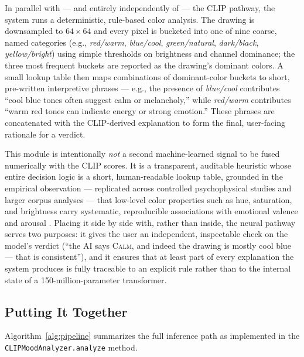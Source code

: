 \documentclass[10pt,twocolumn,letterpaper]{article}
\begin{document}
In parallel with --- and entirely independently of --- the CLIP pathway, the system runs a deterministic, rule-based color analysis. The drawing is downsampled to $64\times64$ and every pixel is bucketed into one of nine coarse, named categories (e.g., \emph{red/warm}, \emph{blue/cool}, \emph{green/natural}, \emph{dark/black}, \emph{yellow/bright}) using simple thresholds on brightness and channel dominance; the three most frequent buckets are reported as the drawing's dominant colors. A small lookup table then maps combinations of dominant-color buckets to short, pre-written interpretive phrases --- e.g., the presence of \emph{blue/cool} contributes ``cool blue tones often suggest calm or melancholy,'' while \emph{red/warm} contributes ``warm red tones can indicate energy or strong emotion.'' These phrases are concatenated with the CLIP-derived explanation to form the final, user-facing rationale for a verdict.

This module is intentionally \emph{not} a second machine-learned signal to be fused numerically with the CLIP scores. It is a transparent, auditable heuristic whose entire decision logic is a short, human-readable lookup table, grounded in the empirical observation --- replicated across controlled psychophysical studies and larger corpus analyses --- that low-level color properties such as hue, saturation, and brightness carry systematic, reproducible associations with emotional valence and arousal \cite{wilms2018color,colornature2024}. Placing it side by side with, rather than inside, the neural pathway serves two purposes: it gives the user an independent, inspectable check on the model's verdict (``the AI says \textsc{Calm}, and indeed the drawing is mostly cool blue --- that is consistent''), and it ensures that at least part of every explanation the system produces is fully traceable to an explicit rule rather than to the internal state of a 150-million-parameter transformer.

\subsection{Putting It Together}

Algorithm~\ref{alg:pipeline} summarizes the full inference path as implemented in the \texttt{CLIPMoodAnalyzer.analyze} method.
\end{document}
